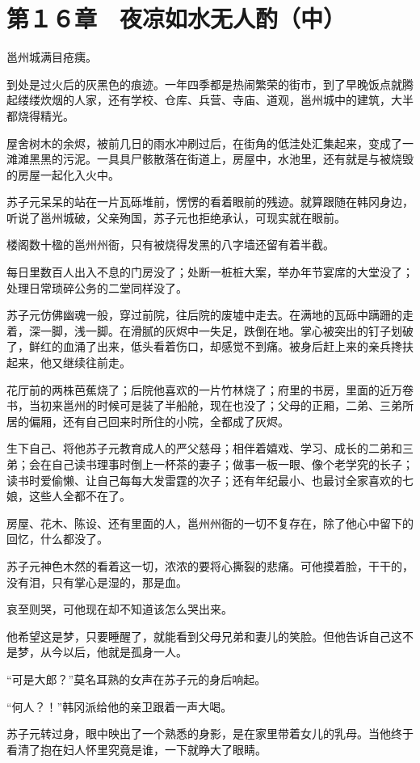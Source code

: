 \section{第１６章　夜凉如水无人酌（中）}

邕州城满目疮痍。

到处是过火后的灰黑色的痕迹。一年四季都是热闹繁荣的街市，到了早晚饭点就腾起缕缕炊烟的人家，还有学校、仓库、兵营、寺庙、道观，邕州城中的建筑，大半都烧得精光。

屋舍树木的余烬，被前几日的雨水冲刷过后，在街角的低洼处汇集起来，变成了一滩滩黑黑的污泥。一具具尸骸散落在街道上，房屋中，水池里，还有就是与被烧毁的房屋一起化入火中。

苏子元呆呆的站在一片瓦砾堆前，愣愣的看着眼前的残迹。就算跟随在韩冈身边，听说了邕州城破，父亲殉国，苏子元也拒绝承认，可现实就在眼前。

楼阁数十楹的邕州州衙，只有被烧得发黑的八字墙还留有着半截。

每日里数百人出入不息的门房没了；处断一桩桩大案，举办年节宴席的大堂没了；处理日常琐碎公务的二堂同样没了。

苏子元仿佛幽魂一般，穿过前院，往后院的废墟中走去。在满地的瓦砾中蹒跚的走着，深一脚，浅一脚。在滑腻的灰烬中一失足，跌倒在地。掌心被突出的钉子划破了，鲜红的血涌了出来，低头看着伤口，却感觉不到痛。被身后赶上来的亲兵搀扶起来，他又继续往前走。

花厅前的两株芭蕉烧了；后院他喜欢的一片竹林烧了；府里的书房，里面的近万卷书，当初来邕州的时候可是装了半船舱，现在也没了；父母的正厢，二弟、三弟所居的偏厢，还有自己回来时所住的小院，全都成了灰烬。

生下自己、将他苏子元教育成人的严父慈母；相伴着嬉戏、学习、成长的二弟和三弟；会在自己读书理事时倒上一杯茶的妻子；做事一板一眼、像个老学究的长子；读书时爱偷懒、让自己每每大发雷霆的次子；还有年纪最小、也最讨全家喜欢的七娘，这些人全都不在了。

房屋、花木、陈设、还有里面的人，邕州州衙的一切不复存在，除了他心中留下的回忆，什么都没了。

苏子元神色木然的看着这一切，浓浓的要将心撕裂的悲痛。可他摸着脸，干干的，没有泪，只有掌心是湿的，那是血。

哀至则哭，可他现在却不知道该怎么哭出来。

他希望这是梦，只要睡醒了，就能看到父母兄弟和妻儿的笑脸。但他告诉自己这不是梦，从今以后，他就是孤身一人。

“可是大郎？”莫名耳熟的女声在苏子元的身后响起。

“何人？！”韩冈派给他的亲卫跟着一声大喝。

苏子元转过身，眼中映出了一个熟悉的身影，是在家里带着女儿的乳母。当他终于看清了抱在妇人怀里究竟是谁，一下就睁大了眼睛。

